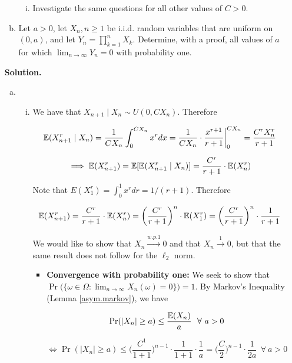 \begin{enumerate}[(1)]
\begin{enumerate}[(a)]
\begin{enumerate}[(i)]
\item Investigate the same questions for all other values of \(C > 0\).

\end{enumerate}

\item Let \(a > 0\), let \(X_n, n \geq 1\) be i.i.d. random variables that are uniform on \((0, a)\), and let \(Y_n = \prod_{k=1}^n X_k\). Determine, with a proof, all values of \(a\) for which \(\lim_{n \to \infty} Y_n = 0\) with probability one.

\end{enumerate}

\textbf{Solution.} \begin{enumerate}[(a)]

\item 

\begin{enumerate}[(i)]

\item We have that \(X_{n+1} \mid X_n \sim U(0, C X_n)\). Therefore

\[
\mathbb{E}(X_{n+1}^r \mid X_n) = \frac{1}{C X_n} \int_{0}^{CX_n} x^r dx = \frac{1}{CX_n} \cdot \frac{x^{r+1}}{r+1} \bigg|_0^{CX_n} = \frac{C^rX_n^r}{r+1}
\]

\[
\implies \mathbb{E}(X_{n+1}^r) = \mathbb{E}[\mathbb{E}(X_{n+1}^r \mid X_n)] = \frac{C^r}{r+1} \cdot \mathbb{E}( X_n^r)
\]

Note that \(E(X_1^r) = \int_0^1 x^r dr = 1/(r+1)\). Therefore 

\[
\mathbb{E}(X_{n+1}^r) = \frac{C^r}{r+1} \cdot \mathbb{E}( X_n^r) = \bigg( \frac{C^r}{r+1}\bigg)^n \cdot \mathbb{E}(X_1^r) = \bigg( \frac{C^r}{r+1}\bigg)^n \cdot \frac{1}{r+1}
\]

We would like to show that \(X_n \xrightarrow{w.p.1} 0\) and that \(X_n \xrightarrow{1} 0\), but that the same result does not follow for the \(\ell_2\) norm.

\begin{itemize}

\item \textbf{Convergence with probability one:} We seek to show that \(\Pr\big( \{\omega \in \Omega: \lim_{n \to \infty} X_n(\omega) = 0 \} \big) = 1\). By Markov's Inequality (Lemma \ref{asym.markov}), we have

\[
\Pr(|X_n| \geq a) \leq \frac{\mathbb{E}(X_n)}{a} \ \ \forall \ a > 0
\]

\[
\iff \Pr(|X_n| \geq a) \leq \bigg( \frac{C^1}{1+1}\bigg)^{n-1} \cdot \frac{1}{1+1} \cdot \frac{1}{a} =   \bigg( \frac{C}{2}\bigg)^{n-1} \cdot \frac{1}{2a}  \ \ \forall \ a > 0
\]


\end{itemize}
\end{enumerate}
\end{enumerate}
\end{enumerate}

